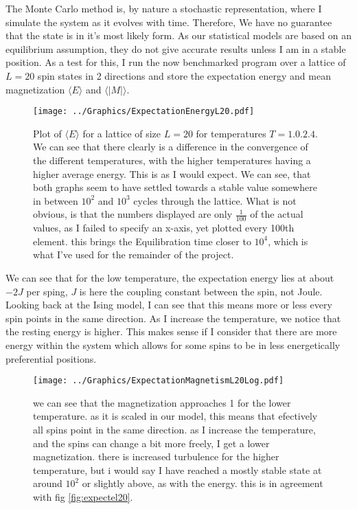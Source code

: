 \documentclass[10pt, twocolumn]{revtex4-1}
\begin{document}
The Monte Carlo method is, by nature a stochastic representation, where I simulate the system as it evolves with time. Therefore, We have no guarantee that
the state is in it's most likely form. As our statistical models are based on an equilibrium assumption, they do not give accurate results unless I am in
a stable position. As a test for this, I run the now benchmarked program over a lattice of $L=20$ spin states in 2 directions and store the expectation
energy and mean magnetization $\langle E \rangle$ and $\langle |M| \rangle$.
\begin{figure}[hbtp]
\texttt{[image: ../Graphics/ExpectationEnergyL20.pdf]}
    \caption{Plot of $\langle E \rangle$ for a lattice of size $L=20$ for temperatures $T = \qty{ 1.0, 2.4 }$. We can see that there clearly is
        a difference in the convergence of the different temperatures, with the higher temperatures having a higher average energy. This
        is as I would expect. We can see, that both graphs seem to have settled towards a stable value somewhere in between $10^2$ and $10^3$
        cycles through the lattice. What is not obvious, is that the numbers displayed are only $\frac{1}{100}$ of the actual values, as I failed
        to specify an x-axis, yet plotted every 100th element. this brings the Equilibration time closer to $10^4$, which is what I've used for the
        remainder of the project.}
\label{fig:ExpectEL20}
\end{figure}
We can see that for the low temperature, the expectation energy lies at about $-2J$ per sping, $J$ is here the coupling constant between the spin, not
Joule. Looking back at the Ising model, I can see that this means more or less every spin points in the same direction. As I increase the temperature,
we notice that the resting energy is higher. This makes sense if I consider that there are more energy within the system which allows for some spins to be
in less energetically preferential positions.
\begin{figure}[hbtp]
    \texttt{[image: ../Graphics/ExpectationMagnetismL20Log.pdf]}
    \caption{we can see that the magnetization approaches 1 for the lower temperature. as it is scaled in our model, this means that efectively all spins
    point in the same direction. as I increase the temperature, and the spins can change a bit more freely, I get a lower magnetization. there is increased
    turbulence for the higher temperature, but i would say I have reached a mostly stable state at around $10^2$ or slightly above, as with the energy.
    this is in agreement with fig \ref{fig:expectel20}.}
\label{fig:expectml20}
\end{figure}
\end{document}
